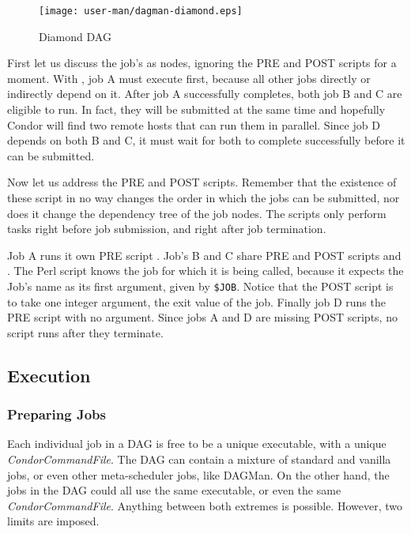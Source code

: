 \begin{figure}[hbt]
\centering
\texttt{[image: user-man/dagman-diamond.eps]}
\caption{\label{fig:dagman-diamond}Diamond DAG}
\end{figure}

First let us discuss the job's as nodes, ignoring the PRE and POST scripts
for a moment.  With , job A must execute first, because all
other jobs directly or indirectly depend on it.  After job A successfully
completes, both job B and C are eligible to run.  In fact, they will be
submitted at the same time and hopefully Condor will find two remote hosts
that can run them in parallel.  Since job D depends on both B and C, it must
wait for both to complete successfully before it can be submitted.

Now let us address the PRE and POST scripts.  Remember that the existence of
these script in no way changes the order in which the jobs can be submitted,
nor does it change the dependency tree of the job nodes.  The scripts only
perform tasks right before job submission, and right after job termination.

Job A runs it own PRE script .  Job's B and C share PRE and
POST scripts  and .  The Perl script
knows the job for which it is being called, because it expects the Job's
name as its first argument, given by \texttt{\$JOB}.  Notice that the POST
script is to take one integer argument, the exit value of the job.  Finally
job D runs the PRE script  with no argument.  Since jobs
A and D are missing POST scripts, no script runs after they terminate.

\subsection{Execution}

\subsubsection{\label{dagman:prepjob}Preparing Jobs}

Each individual job in a DAG is free to be a unique executable, with a unique
\textit{CondorCommandFile}.  The DAG can contain a mixture of standard and
vanilla jobs, or even other meta-scheduler jobs, like DAGMan.  On the other
hand, the jobs in the DAG could all use the same executable, or even the same
\textit{CondorCommandFile}.  Anything between both extremes is possible.
However, two limits are imposed.

